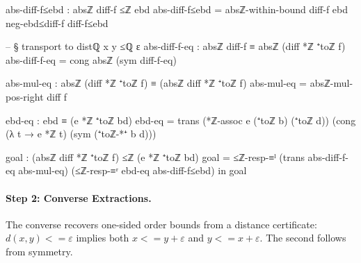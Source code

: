 \documentclass[11pt,a4paper]{book}
\def\leq{<=}%
\begin{document}
\begin{code}
    abs-diff-f≤ebd : absℤ diff-f ≤ℤ ebd
    abs-diff-f≤ebd = absℤ-within-bound diff-f ebd neg-ebd≤diff-f diff-f≤ebd

    -- § transport to distℚ x y ≤ℚ ε
    abs-diff-f-eq : absℤ diff-f ≡ absℤ (diff *ℤ ⁺toℤ f)
    abs-diff-f-eq = cong absℤ (sym diff-f-eq)

    abs-mul-eq : absℤ (diff *ℤ ⁺toℤ f) ≡ (absℤ diff *ℤ ⁺toℤ f)
    abs-mul-eq = absℤ-mul-pos-right diff f

    ebd-eq : ebd ≡ (e *ℤ ⁺toℤ bd)
    ebd-eq =
      trans
        (*ℤ-assoc e (⁺toℤ b) (⁺toℤ d))
        (cong (λ t → e *ℤ t) (sym (⁺toℤ-*⁺ b d)))

    goal : (absℤ diff *ℤ ⁺toℤ f) ≤ℤ (e *ℤ ⁺toℤ bd)
    goal = ≤ℤ-resp-≡ˡ (trans abs-diff-f-eq abs-mul-eq) (≤ℤ-resp-≡ʳ ebd-eq abs-diff-f≤ebd)
  in
  goal
\end{code}

\paragraph{Step 2: Converse Extractions.}
The converse recovers one-sided order bounds from a distance certificate:
$d(x,y) \leq \varepsilon$ implies both $x \leq y + \varepsilon$
and $y \leq x + \varepsilon$. The second follows from symmetry.
\end{document}
